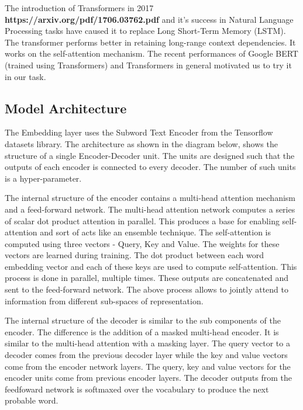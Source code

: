 The introduction of Transformers in 2017 \textbf{https://arxiv.org/pdf/1706.03762.pdf} and it's success in Natural Language Processing tasks have caused it to replace Long Short-Term Memory (LSTM). The transformer performs better in retaining long-range context dependencies. It works on the self-attention mechanism. The recent performances of Google BERT (trained using Transformers) and Transformers in general motivated us to try it in our task.

\subsection{Model Architecture}

The Embedding layer uses the Subword Text Encoder from the Tensorflow datasets library. The architecture as shown in the diagram below, shows the structure of a single Encoder-Decoder unit. The units are designed such that the outputs of each encoder is connected to every decoder. The number of such units is a hyper-parameter.

The internal structure of the encoder contains a multi-head attention mechanism and a feed-forward network. The multi-head attention network computes a series of scalar dot product attention in parallel. This produces a base for enabling self-attention and sort of acts like an ensemble technique. The self-attention is computed using three vectors - Query, Key and Value. The weights for these vectors are learned during training. The dot product between each word embedding vector and each of these keys are used to compute self-attention. This process is done in parallel, multiple times. These outputs are concatenated and sent to the feed-forward network. The above process allows to jointly attend to information from different sub-spaces of representation.

The internal structure of the decoder is similar to the sub components of the encoder. The difference is the addition of a masked multi-head encoder. It is similar to the multi-head attention with a masking layer. The query vector to a decoder comes from the previous decoder layer while the key and value vectors come from the encoder network layers. The query, key and value vectors for the encoder units come from previous encoder layers. The decoder outputs from the feedfoward network is softmaxed over the vocabulary to produce the next probable word.

